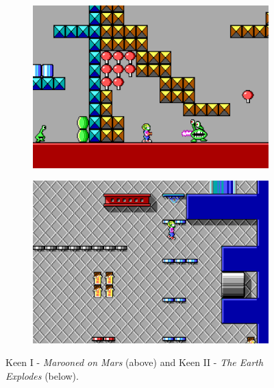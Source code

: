 \documentclass[book.tex]{subfiles}
\begin{document}
\begin{figure}[H]
\centering
\begin{subfigure}[b]{\textwidth}
  \includegraphics[width=.95\textwidth]{screenshots_300dpi/Keen_Marooned_on_Mars_gameplay.png}
\end{subfigure}
\par\bigskip %
\begin{subfigure}[b]{\textwidth}
  \includegraphics[width=.95\textwidth]{screenshots_300dpi/keen1_2.png}
\end{subfigure}
\caption*{Keen I - \textit{Marooned on Mars} (above) and Keen II - \textit{The Earth Explodes} (below).}
\end{figure}
 
\end{document}
